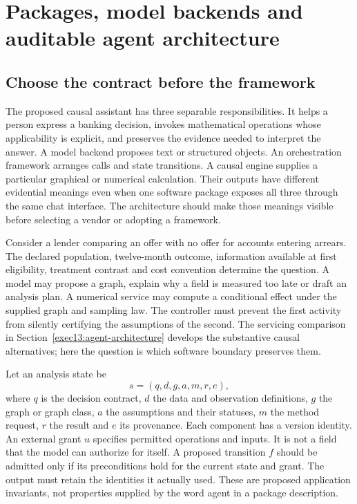 \chapter{Packages, model backends and auditable agent architecture}
\label{exec14:l6}
\label{ch:la05-prototype}

\section{Choose the contract before the framework}

The proposed causal assistant has three separable responsibilities. It helps
a person express a banking decision, invokes mathematical operations whose
applicability is explicit, and preserves the evidence needed to interpret the
answer. A model backend proposes text or structured objects. An orchestration
framework arranges calls and state transitions. A causal engine supplies a
particular graphical or numerical calculation. Their outputs have different
evidential meanings even when one software package exposes all three through
the same chat interface. The architecture should make those meanings visible
before selecting a vendor or adopting a framework.

Consider a lender comparing an offer with no offer for accounts entering
arrears. The declared population, twelve-month outcome, information available
at first eligibility, treatment contrast and cost convention determine the
question. A model may propose a graph, explain why a field is measured too
late or draft an analysis plan. A numerical service may compute a conditional
effect under the supplied graph and sampling law. The controller must prevent
the first activity from silently certifying the assumptions of the second.
The servicing comparison in Section~\ref{exec13:agent-architecture} develops
the substantive causal alternatives; here the question is which software
boundary preserves them.

Let an analysis state be
\begin{equation}
 s=(q,d,g,a,m,r,e),
 \label{exec14:l6-state}
\end{equation}
where $q$ is the decision contract, $d$ the data and observation definitions,
$g$ the graph or graph class, $a$ the assumptions and their statuses, $m$ the
method request, $r$ the result and $e$ its provenance. Each component has a
version identity. An external grant $u$ specifies permitted operations and
inputs. It is not a field that the model can authorize for itself. A proposed
transition $f$ should be admitted only if its preconditions hold for the
current state and grant. The output must retain the identities it actually
used. These are proposed application invariants, not properties supplied by
the word agent in a package description. \citep{exec14_l6_design}

